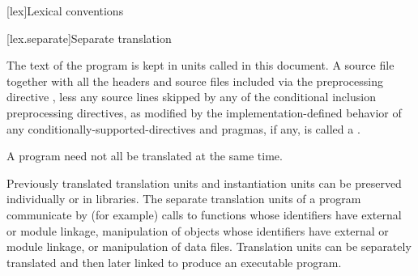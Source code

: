 [lex]{Lexical conventions}



[lex.separate]{Separate translation}

\pnum
{}%
%
The text of the program is kept in units called
 in this document.
A source file together with all the headers
and source files included via the preprocessing
directive , less any source lines skipped by any of the
conditional inclusion preprocessing directives,
as modified by the implementation-defined behavior of any
conditionally-supported-directives and pragmas,
if any, is
called a .
\begin{note}
A \Cpp{} program need not all be translated at the same time.
\end{note}

\pnum
\begin{note}
Previously translated translation units and instantiation
units can be preserved individually or in libraries. The separate
translation units of a program communicate by (for
example)
calls to functions whose identifiers have external or module linkage,
manipulation of objects whose identifiers have external or module linkage, or
manipulation of data files. Translation units can be separately
translated and then later linked to produce an executable
program.
\end{note}

